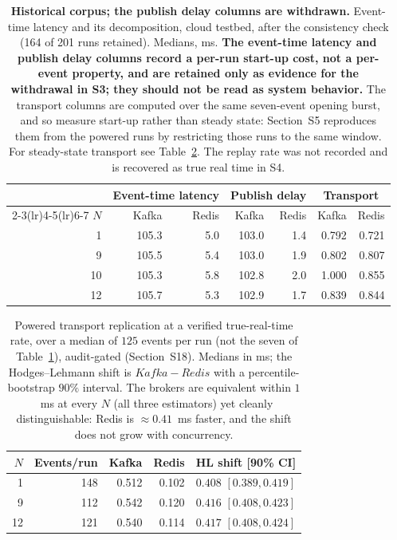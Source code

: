 \documentclass[10pt,journal,onecolumn]{IEEEtran}
\newcommand{\kafka}{Kafka}
\newcommand{\redis}{Redis}
\begin{document}
\begin{table}[t]
\caption[Historical corpus; the publish delay columns are withdrawn]{\textbf{Historical corpus; the publish delay columns are withdrawn.} Event-time latency
and its decomposition, cloud testbed, after the consistency check (164 of 201 runs retained).
Medians, ms. \textbf{The event-time latency and publish delay columns record a per-run start-up cost, not a
per-event property, and are retained only as evidence for the withdrawal in S3; they should not be read as system behavior.} The transport columns
are computed over the same seven-event opening burst, and so measure start-up rather than
steady state: Section~S5 reproduces them from the powered runs by restricting
those runs to the same window. For steady-state transport see Table~\ref{tab:transport}. The
replay rate was not recorded and is recovered as true real time in S4.}
\label{tab:e1}
\begin{tabular}{rrrrrrr}
\toprule
& \multicolumn{2}{c}{Event-time latency} & \multicolumn{2}{c}{Publish delay}
& \multicolumn{2}{c}{Transport} \\
\cmidrule(lr){2-3}\cmidrule(lr){4-5}\cmidrule(lr){6-7}
$N$ & \kafka{} & \redis{} & \kafka{} & \redis{} & \kafka{} & \redis{} \\
\midrule
1  & 105.3 & 5.0 & 103.0 & 1.4 & 0.792 & 0.721 \\
9  & 105.5 & 5.4 & 103.0 & 1.9 & 0.802 & 0.807 \\
10 & 105.3 & 5.8 & 102.8 & 2.0 & 1.000 & 0.855 \\
12 & 105.7 & 5.3 & 102.9 & 1.7 & 0.839 & 0.844 \\
\bottomrule
\end{tabular}
\end{table}
\begin{table}[t]
\caption{Powered transport replication at a verified true-real-time rate, over a median of $125$
events per run (not the seven of Table~\ref{tab:e1}), audit-gated (Section~S18). Medians in ms; the
Hodges--Lehmann shift is $\kafka{}-\redis{}$ with a percentile-bootstrap $90\%$ interval. The
brokers are equivalent within $1$~ms at every $N$ (all three estimators) yet cleanly
distinguishable: \redis{} is $\approx 0.41$~ms faster, and the shift does not grow with
concurrency.}
\label{tab:transport}
\begin{tabular}{rrrrr}
\toprule
$N$ & Events/run & \kafka{} & \redis{} & HL shift [90\% CI] \\
\midrule
1  & 148 & 0.512 & 0.102 & $0.408$ $[0.389, 0.419]$ \\
9  & 112 & 0.542 & 0.120 & $0.416$ $[0.408, 0.423]$ \\
12 & 121 & 0.540 & 0.114 & $0.417$ $[0.408, 0.424]$ \\
\bottomrule
\end{tabular}
\end{table}
\end{document}
